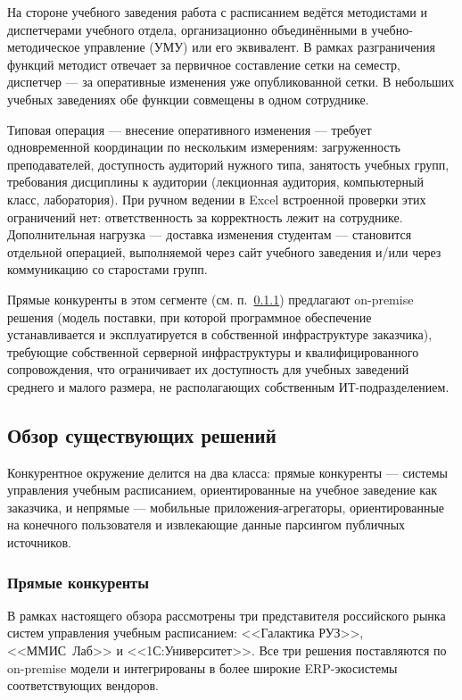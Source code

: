 На стороне учебного заведения работа с расписанием ведётся методистами и диспетчерами учебного отдела, организационно объединёнными в учебно-методическое управление (УМУ) или его эквивалент. В рамках разграничения функций методист отвечает за первичное составление сетки на семестр, диспетчер --- за оперативные изменения уже опубликованной сетки. В небольших учебных заведениях обе функции совмещены в одном сотруднике.

Типовая операция --- внесение оперативного изменения --- требует одновременной координации по нескольким измерениям: загруженность преподавателей, доступность аудиторий нужного типа, занятость учебных групп, требования дисциплины к аудитории (лекционная аудитория, компьютерный класс, лаборатория). При ручном ведении в Excel встроенной проверки этих ограничений нет: ответственность за корректность лежит на сотруднике. Дополнительная нагрузка --- доставка изменения студентам --- становится отдельной операцией, выполняемой через сайт учебного заведения и/или через коммуникацию со старостами групп.

Прямые конкуренты в этом сегменте (см. п.~\ref{subsubsec:direct-competitors}) предлагают on-premise решения (модель поставки, при которой программное обеспечение устанавливается и эксплуатируется в собственной инфраструктуре заказчика), требующие собственной серверной инфраструктуры и квалифицированного сопровождения, что ограничивает их доступность для учебных заведений среднего и малого размера, не располагающих собственным ИТ-подразделением.

\subsection{Обзор существующих решений}
\label{subsec:existing-solutions}

Конкурентное окружение делится на два класса: прямые конкуренты --- системы управления учебным расписанием, ориентированные на учебное заведение как заказчика, и непрямые --- мобильные приложения-агрегаторы, ориентированные на конечного пользователя и извлекающие данные парсингом публичных источников.

\subsubsection{Прямые конкуренты}
\label{subsubsec:direct-competitors}

В рамках настоящего обзора рассмотрены три представителя российского рынка систем управления учебным расписанием: <<Галактика РУЗ>>, <<ММИС~Лаб>> и <<1С:Университет>>. Все три решения поставляются по on-premise модели и интегрированы в более широкие ERP-экосистемы соответствующих вендоров.


